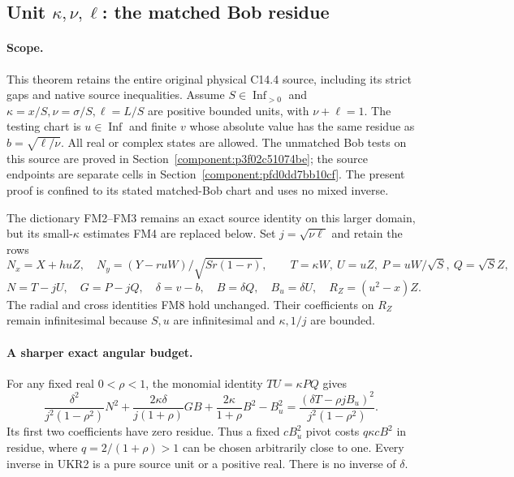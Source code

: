 \subsection{Unit $\kappa,\nu,\ell$: the matched Bob residue}

\label{component:pd26b89cdb3f0}

\label{pd26b89cdb3f0:sec:new-c144-unit-kappa-matched}

\paragraph{Scope.}
This theorem retains the entire original physical C14.4 source,
including its strict gaps and native source inequalities. Assume
$S\in\operatorname{Inf}_{>0}$ and $\kappa=x/S,\nu=\sigma/S,
\ell=L/S$ are positive bounded units, with $\nu+\ell=1$.
The testing chart is $u\in\operatorname{Inf}$ and finite $v$
whose absolute value has the same residue as
$b=\sqrt{\ell/\nu}$. All real or complex states are allowed.
The unmatched Bob tests on this source are proved in Section~\ref{component:p3f02c51074be}; the source endpoints are separate cells in Section~\ref{component:pfd0dd7bb10cf}. The present proof is confined to its stated matched-Bob chart and uses no mixed inverse.

The dictionary FM2--FM3 remains an exact source identity on this
larger domain, but its small-$\kappa$ estimates FM4 are replaced
below. Set $j=\sqrt{\nu\ell}$ and retain the rows
\[
 N_x=X+huZ,\quad N_y=(Y-ruW)/\sqrt{Sr(1-r)},\qquad
 T=\kappa W,\ U=uZ,\ P=uW/\sqrt S,\ Q=\sqrt S Z,
\]
\[
 N=T-jU,\quad G=P-jQ,\quad \delta=v-b,\quad
 B=\delta Q,\quad B_u=\delta U,\quad R_Z=(u^2-x)Z.
 \tag{UKR1}
\]
The radial and cross identities FM8 hold unchanged. Their
coefficients on $R_Z$ remain infinitesimal because $S,u$ are
infinitesimal and $\kappa,1/j$ are bounded.

\paragraph{A sharper exact angular budget.}
For any fixed real $0<\rho<1$, the monomial identity $TU=\kappa PQ$
gives
\[
 \frac{\delta^2}{j^2(1-\rho^2)}N^2+
 \frac{2\kappa\delta}{j(1+\rho)}GB+
 \frac{2\kappa}{1+\rho}B^2-B_u^2
   =\frac{(\delta T-\rho jB_u)^2}{j^2(1-\rho^2)}.
 \tag{UKR2}
\]
Its first two coefficients have zero residue. Thus a fixed
$cB_u^2$ pivot costs $q\kappa cB^2$ in residue, where
$q=2/(1+\rho)>1$ can be chosen arbitrarily close to one.
Every inverse in UKR2 is a pure source unit or a positive real.
There is no inverse of $\delta$.

